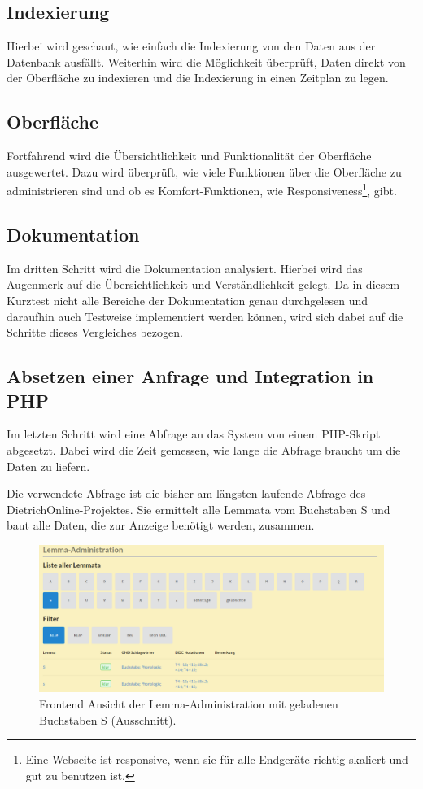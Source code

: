 \subsection{Indexierung}

Hierbei wird geschaut, wie einfach die Indexierung von den Daten aus der Datenbank ausfällt. Weiterhin wird die Möglichkeit überprüft, Daten direkt von der Oberfläche zu indexieren und die Indexierung in einen Zeitplan zu legen.

\subsection{Oberfläche}

Fortfahrend wird die Übersichtlichkeit und Funktionalität der Oberfläche ausgewertet. Dazu wird überprüft, wie viele Funktionen über die Oberfläche zu administrieren sind und ob es Komfort-Funktionen, wie Responsiveness\footnote{Eine Webseite ist responsive, wenn sie für alle Endgeräte richtig skaliert und gut zu benutzen ist.}, gibt.

\subsection{Dokumentation}

Im dritten Schritt wird die Dokumentation analysiert. Hierbei wird das Augenmerk auf die Übersichtlichkeit und Verständlichkeit gelegt. Da in diesem Kurztest nicht alle Bereiche der Dokumentation genau durchgelesen und daraufhin auch Testweise implementiert werden können, wird sich dabei auf die Schritte dieses Vergleiches bezogen.

\subsection{Absetzen einer Anfrage und Integration in PHP}

Im letzten Schritt wird eine Abfrage an das System von einem PHP-Skript abgesetzt. Dabei wird die Zeit gemessen, wie lange die Abfrage braucht um die Daten zu liefern.

Die verwendete Abfrage ist die bisher am längsten laufende Abfrage des DietrichOnline-Projektes. Sie ermittelt alle Lemmata vom Buchstaben S und baut alle Daten, die zur Anzeige benötigt werden, zusammen.

\begin{figure}
	\centering
	\includegraphics[width=1\linewidth]{images/lemmaadministration_sample.PNG}
	\caption{Frontend Ansicht der Lemma-Administration mit geladenen Buchstaben S (Ausschnitt).}
	\label{img:lAdminSample}
\end{figure}


